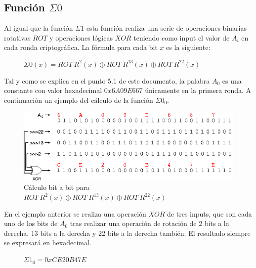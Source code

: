 \documentclass{article}
\begin{document}
    \subsection{Función $\Sigma0$}
        Al igual que la función $\Sigma1$ esta función realiza una serie de operaciones binarias rotativas $ROT$ y operaciones lógicas $XOR$ teniendo como input el valor de $A_{i}$ en cada ronda criptográfica. La fórmula para cada bit $x$ es la siguiente:
            \begin{figure}[H]
            \centering
                $\Sigma0(x) = ROT \ R^{2}(x) \oplus ROT \ R^{13}(x) \oplus ROT \ R^{22}(x)$
            \end{figure}
        Tal y como se explica en el punto 5.1 de este documento, la palabra $A_{0}$ es una constante con valor hexadecimal $0x6A09E667$ únicamente en la primera ronda. A continuación un ejemplo del cálculo de la función $\Sigma0_{0}$.
            \begin{figure}[H]
            \centering
                \includegraphics[scale=0.41]{img/SHA-256-function_Sigma0.png}
                \caption{Cálculo bit a bit para $ROT \ R^{2}(x) \oplus ROT \ R^{13}(x) \oplus ROT \ R^{22}(x)$}
            \end{figure}
        En el ejemplo anterior se realiza una operación $XOR$ de tres inputs, que son cada uno de los bits de $A_{0}$ tras realizar una operación de rotación de 2 bits a la derecha, 13 bits a la derecha y 22 bits a la derecha también. El resultado siempre se expresará en hexadecimal.
            \begin{figure}[H]
            \centering
                $\Sigma1_{0} = 0xCE20B47E$
            \end{figure}
    
\end{document}
